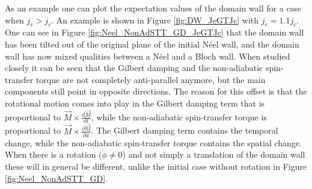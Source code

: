 \documentclass[1p]{elsarticle}		%
\numberwithin{equation}{section}
\begin{document}
As an example one can plot the expectation values of the domain wall for a case when $j_e>j_c$. An example is shown in Figure \ref{fig:DW_JeGTJc} with $j_e = 1.1j_c$. One can see in Figure \ref{fig:Neel_NonAdSTT_GD_JeGTJc} that the domain wall has been tilted out of the original plane of the initial N\'{e}el wall, and the domain wall has now mixed qualities between a N\'{e}el and a Bloch wall. When studied closely it can be seen that the Gilbert damping and the non-adiabatic spin-transfer torque are not completely anti-parallel anymore, but the main components still point in opposite directions. The reason for this offset is that the rotational motion comes into play in the Gilbert damping term that is proportional to $\vec{M}\times\frac{\textrm{d} \vec{M}}{\textrm{d} t}$, while the non-adiabatic spin-transfer torque is proportional to $\vec{M}\times\frac{\partial \vec{M}}{\partial x}$. The Gilbert damping term contains the temporal change, while the non-adiabatic spin-transfer torque contains the spatial change. When there is a rotation ($\dot{\phi} \neq 0$) and not simply a translation of the domain wall these will in general be different, unlike the initial case without rotation in Figure \ref{fig:Neel_NonAdSTT_GD}.
\end{document}
